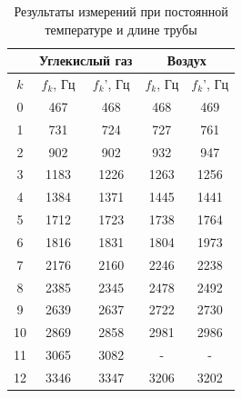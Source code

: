 \documentclass[a4paper, 12pt]{article}
\begin{document}
            \begin{table}[H]
                \centering
                \begin{tabular}{|c|cc|cc|}
                    \hline
                    & \multicolumn{2}{c|}{Углекислый газ} & \multicolumn{2}{c|}{Воздух} \\ \hline
                    $k$ & \multicolumn{1}{c|}{$f_k$, Гц} & $f_{k}$', Гц & \multicolumn{1}{c|}{$f_k$, Гц} & $f_{k}$', Гц \\ \hline
                    0  & \multicolumn{1}{c|}{467}      & 468       & \multicolumn{1}{c|}{468}      & 469       \\ \hline
                    1  & \multicolumn{1}{c|}{731}      & 724       & \multicolumn{1}{c|}{727}      & 761       \\ \hline
                    2  & \multicolumn{1}{c|}{902}      & 902       & \multicolumn{1}{c|}{932}      & 947       \\ \hline
                    3  & \multicolumn{1}{c|}{1183}     & 1226      & \multicolumn{1}{c|}{1263}     & 1256      \\ \hline
                    4  & \multicolumn{1}{c|}{1384}     & 1371      & \multicolumn{1}{c|}{1445}     & 1441      \\ \hline
                    5  & \multicolumn{1}{c|}{1712}     & 1723      & \multicolumn{1}{c|}{1738}     & 1764      \\ \hline
                    6  & \multicolumn{1}{c|}{1816}     & 1831      & \multicolumn{1}{c|}{1804}     & 1973      \\ \hline
                    7  & \multicolumn{1}{c|}{2176}     & 2160      & \multicolumn{1}{c|}{2246}     & 2238      \\ \hline
                    8  & \multicolumn{1}{c|}{2385}     & 2345      & \multicolumn{1}{c|}{2478}     & 2492      \\ \hline
                    9  & \multicolumn{1}{c|}{2639}     & 2637      & \multicolumn{1}{c|}{2722}     & 2730      \\ \hline
                    10 & \multicolumn{1}{c|}{2869}     & 2858      & \multicolumn{1}{c|}{2981}     & 2986      \\ \hline
                    11 & \multicolumn{1}{c|}{3065}     & 3082      & \multicolumn{1}{c|}{-} & - \\ \hline
                    12 & \multicolumn{1}{c|}{3346}     & 3347      & \multicolumn{1}{c|}{3206}     & 3202      \\ \hline
                \end{tabular}
                \caption{Результаты измерений при постоянной температуре и длине трубы}
                \label{tab:constL}
            \end{table}
\end{document}
